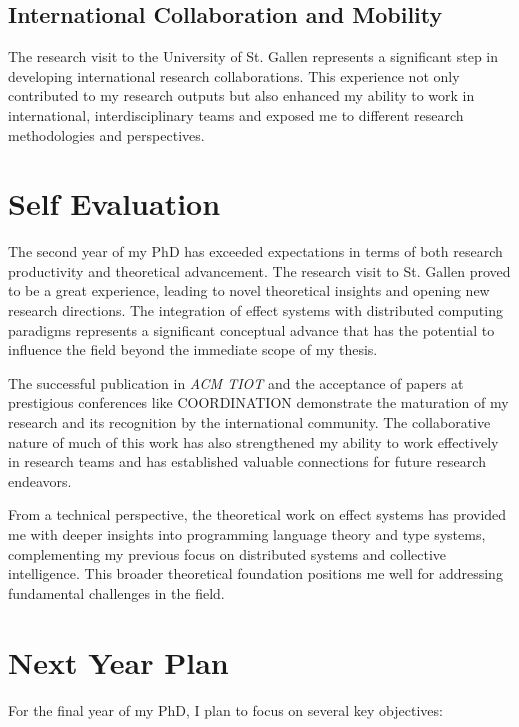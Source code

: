 \documentclass[runningheads]{llncs}
\begin{document}
\subsection{International Collaboration and Mobility}

The research visit to the University of St. Gallen represents a significant step in developing international research collaborations. This experience not only contributed to my research outputs but also enhanced my ability to work in international, interdisciplinary teams and exposed me to different research methodologies and perspectives.

\section{Self Evaluation}

The second year of my PhD has exceeded expectations in terms of both research productivity and theoretical advancement.
%
The research visit to St. Gallen proved to be a great experience,
leading to novel theoretical insights and opening new research directions.
%
The integration of effect systems with distributed computing paradigms represents a significant conceptual advance that has the potential to influence the field beyond the immediate scope of my thesis.

The successful publication in \emph{ACM TIOT} and the acceptance of papers at prestigious conferences like COORDINATION demonstrate the maturation of my research and its recognition by the international community.
%
The collaborative nature of much of this work has also strengthened my ability to work effectively in research teams and has established valuable connections for future research endeavors.

From a technical perspective,
the theoretical work on effect systems has provided me with deeper insights into programming language theory and type systems,
complementing my previous focus on distributed systems and collective intelligence.
%
This broader theoretical foundation positions me well for addressing fundamental challenges in the field.

\section{Next Year Plan}

For the final year of my PhD, I plan to focus on several key objectives:
\end{document}
